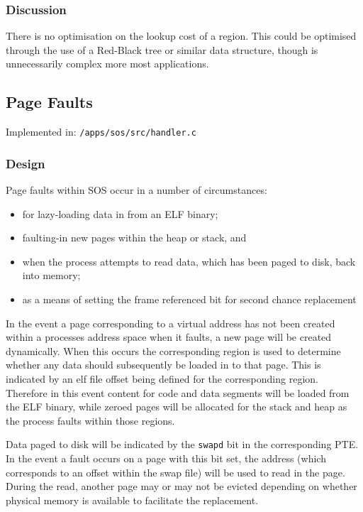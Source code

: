\documentclass[a4paper,12pt]{article}
\begin{document}
\subsubsection{Discussion}
There is no optimisation on the lookup cost of a region.  This could be
optimised through the use of a Red-Black tree or similar data structure,
though is unnecessarily complex more most applications.

\subsection{Page Faults}
Implemented in: \texttt{/apps/sos/src/handler.c}

\subsubsection{Design}
Page faults within SOS occur in a number of circumstances:

\begin{itemize}
\item for lazy-loading data in from an ELF binary;
\item faulting-in new pages within the heap or stack, and
\item when the process attempts to read data, which has been paged to disk, back into memory;
\item as a means of setting the frame referenced bit for second chance replacement
\end{itemize}

In the event a page corresponding to a virtual address has not been created
within a processes address space when it faults, a new page will be created
dynamically.  When this occurs the corresponding region is used to determine
whether any data should subsequently be loaded in to that page.  This is
indicated by an elf file offset being defined for the corresponding region.
Therefore in this event content for code and data segments will be loaded from
the ELF binary, while zeroed pages will be allocated for the stack and heap as
the process faults within those regions.

Data paged to disk will be indicated by the \texttt{swapd} bit in the corresponding
PTE.  In the event a fault occurs on a page with this bit set, the address
(which corresponds to an offset within the swap file) will be used to read in
the page.  During the read, another page may or may not be evicted depending
on whether physical memory is available to facilitate the replacement.
\end{document}
